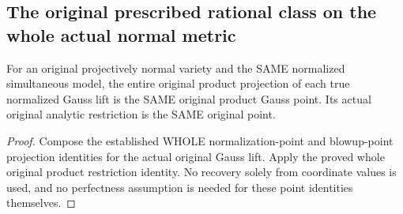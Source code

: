 \subsection{The original prescribed rational class on the whole actual normal metric}

\begin{lemma}
\label{local:actual-normalized-full-point-gauss-inverse}
\leanok
{}
For an original projectively normal variety and the SAME normalized
simultaneous model, the entire original product projection of each true
normalized Gauss lift is the SAME original product Gauss point. Its
actual original analytic restriction is the SAME original point.
\end{lemma}
\begin{proof}
Compose the established WHOLE normalization-point and blowup-point
projection identities for the actual original Gauss lift. Apply the
proved whole original product restriction identity. No recovery solely
from coordinate values is used, and no perfectness assumption is needed
for these point identities themselves.
\end{proof}

